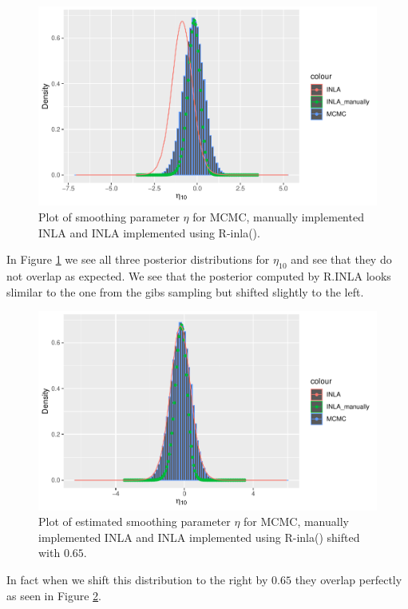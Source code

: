 \begin{figure}[h]
    \centering
    \includegraphics[width=\textwidth]{Images/smoothing_comparison.pdf}
    \caption{Plot of smoothing parameter $\eta$ for MCMC, manually implemented INLA and INLA implemented using R-inla().}
    \label{fig:smoothing_comparison}
\end{figure}

In Figure \ref{fig:smoothing_comparison} we see all three posterior distributions for $\eta_{10}$ and see that they do not overlap as expected. We see that the posterior computed by R.INLA looks slimilar to the one from the gibs sampling but shifted slightly to the left. 

\begin{figure}[h]
    \centering
    \includegraphics[width=\textwidth]{Images/smoothing_comparison_shifted.pdf}
    \caption{Plot of estimated smoothing parameter $\eta$ for MCMC, manually implemented INLA and INLA implemented using R-inla() shifted with $0.65$.}
    \label{fig:smoothing_shift}
\end{figure}
In fact when we shift this distribution to the right by $0.65$ they overlap perfectly as seen in Figure \ref{fig:smoothing_shift}. 


